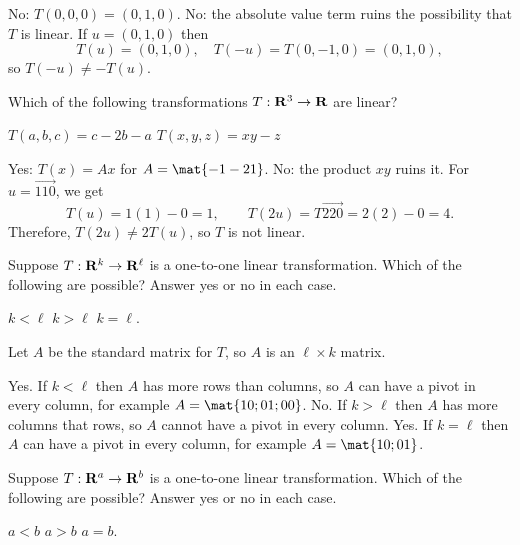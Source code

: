 \begin{problems}
\begin{solution}
  \begin{subproblems}
    \subproblem No: $T(0, 0, 0) = (0, 1, 0)$.%
    \subproblem No: the absolute value term ruins the possibility
    that $T$ is linear.  If $u = (0, 1, 0)$ then
    \[T(u) = (0, 1, 0), \quad T(-u) = T(0,-1,0)= (0,1,0),\] so
    $T(-u) \neq -T(u)$. %
  \end{subproblems}
\end{solution}


\problem Which of the following transformations $T: {\bf R}^3
\to {\bf R}$ are linear?
\begin{subproblems}
\subproblem $T(a, b, c) = c-2b-a$
\subproblem $T(x, y, z) = xy-z$ %
\end{subproblems}

\begin{solution}
  \begin{subproblems}
    \subproblem Yes: $T(x) = Ax$ for $A = \mat{-1 -2 1}$. %
    \subproblem No: the product $xy$ ruins it.  For $u = \vec{1 1 0}$,
    we get
    \[T(u) = 1(1)-0 = 1, \qquad T(2u) = T\vec{2 2 0} = 2(2)-0 = 4.\]
    Therefore, $T(2u) \neq 2 T(u)$, so $T$ is not linear.
  \end{subproblems}
\end{solution}

\problem Suppose $T: {\bf R}^k \to {\bf R}^{\ell}$ is a one-to-one
linear transformation.  Which of the following are possible? Answer
yes or no in each case.
\begin{subproblems}
  \subproblem $k < \ell$
  \subproblem $k > \ell$
  \subproblem $k = \ell$.
\end{subproblems}

\begin{solution}
  Let $A$ be the standard matrix for $T$, so $A$ is an $\ell \times k$
  matrix.
  \begin{subproblems}
    \subproblem Yes.  If $k < \ell$ then $A$ has more rows than
    columns, so $A$ can have a pivot in every column, for example
    $A = \mat{1 0; 0 1; 0 0}$. %
    \subproblem No.  If $k > \ell$ then $A$ has more columns that
    rows, so $A$ cannot have a pivot in every column. %
    \subproblem Yes.  If $k = \ell$ then $A$ can have a pivot in every
    column, for example $A = \mat{1 0; 0 1}$.
  \end{subproblems}
\end{solution}

\problem Suppose $T: {\bf R}^a \to {\bf R}^b$ is a one-to-one
linear transformation.  Which of the following are possible? Answer
yes or no in each case.
\begin{subproblems}
  \subproblem $a < b$
  \subproblem $a > b$
  \subproblem $a = b$.
\end{subproblems}


\end{problems}
